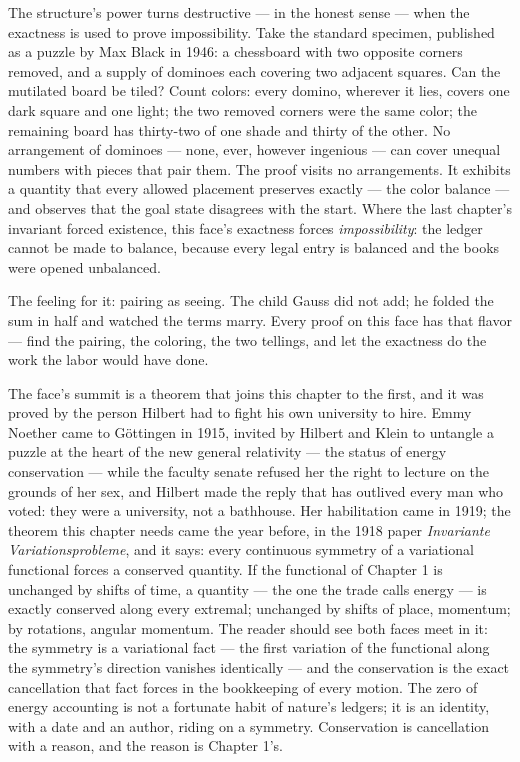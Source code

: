 The structure's power turns destructive --- in the honest sense --- when
the exactness is used to prove impossibility. Take the standard specimen,
published as a puzzle by Max Black in 1946: a chessboard with two
opposite corners removed, and a supply of dominoes each covering two
adjacent squares. Can the mutilated board be tiled? Count colors: every
domino, wherever it lies, covers one dark square and one light; the two
removed corners were the same color; the remaining board has thirty-two
of one shade and thirty of the other. No arrangement of dominoes ---
none, ever, however ingenious --- can cover unequal numbers with pieces
that pair them. The proof visits no arrangements. It exhibits a quantity
that every allowed placement preserves exactly --- the color balance ---
and observes that the goal state disagrees with the start. Where the
last chapter's invariant forced existence, this face's exactness forces
\emph{impossibility}: the ledger cannot be made to balance, because
every legal entry is balanced and the books were opened unbalanced.

\begin{intuition}
The feeling for it: pairing as seeing. The child Gauss did not add; he
folded the sum in half and watched the terms marry. Every proof on this
face has that flavor --- find the pairing, the coloring, the two
tellings, and let the exactness do the work the labor would have done.
\end{intuition}

The face's summit is a theorem that joins this chapter to the first, and
it was proved by the person Hilbert had to fight his own university to
hire. Emmy Noether came to G\"ottingen in 1915, invited by Hilbert and
Klein to untangle a puzzle at the heart of the new general relativity
--- the status of energy conservation --- while the faculty senate
refused her the right to lecture on the grounds of her sex, and Hilbert
made the reply that has outlived every man who voted: they were a
university, not a bathhouse. Her habilitation came in 1919; the theorem
this chapter needs came the year before, in the 1918 paper
\emph{Invariante Variationsprobleme}, and it says: every continuous
symmetry of a variational functional forces a conserved quantity. If the
functional of Chapter 1 is unchanged by shifts of time, a quantity ---
the one the trade calls energy --- is exactly conserved along every
extremal; unchanged by shifts of place, momentum; by rotations, angular
momentum. The reader should see both faces meet in it: the symmetry is a
variational fact --- the first variation of the functional along the
symmetry's direction vanishes identically --- and the conservation is
the exact cancellation that fact forces in the bookkeeping of every
motion. The zero of energy accounting is not a fortunate habit of
nature's ledgers; it is an identity, with a date and an author, riding
on a symmetry. Conservation is cancellation with a reason, and the
reason is Chapter 1's.

